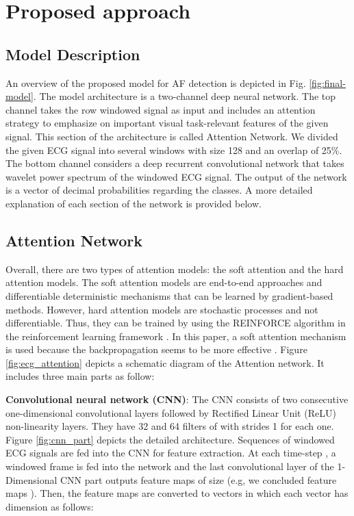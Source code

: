 \documentclass[conference]{IEEEtran}
\begin{document}
\section{Proposed approach}
\label{sec:propsed}
\subsection{Model Description}
An overview of the proposed model for AF detection is depicted in Fig. \ref{fig:final-model}. The model architecture is a two-channel deep neural network. The top channel takes the row windowed signal as input and includes an attention strategy to emphasize on important visual task-relevant features of the given signal. This section of the architecture is called Attention Network. We divided the given ECG signal into several windows with size 128 and an overlap of 25\%. The bottom channel considers a deep recurrent convolutional network that takes wavelet power spectrum of the windowed ECG signal. The output of the network is a vector of decimal probabilities regarding the classes. A more detailed explanation of each section of the network is provided below.

\subsection*{Attention Network}
Overall, there are two types of attention models: the soft attention and the hard attention models. The soft attention models are end-to-end approaches and differentiable deterministic mechanisms
that can be learned by gradient-based methods. However, hard attention models are stochastic processes and not differentiable. Thus, they can be trained by using the REINFORCE algorithm \cite{williams1992simple} in the reinforcement learning framework \cite{mousavi2016deep}.
In this paper, a soft attention mechanism is used because the backpropagation seems to be more effective  \cite{xu2015show,mousavi2016learning}. Figure \ref{fig:ecg_attention} depicts a schematic diagram  of the Attention network. It includes three main parts as follow:

\noindent\textbf{ Convolutional neural network (CNN)}: The CNN consists of two consecutive one-dimensional convolutional layers followed by Rectified Linear Unit (ReLU) non-linearity layers. They have 32 and 64 filters of  with strides 1 for each one. Figure \ref{fig:cnn_part} depicts the detailed architecture.  Sequences of windowed ECG signals are fed into the CNN for feature extraction. At each time-step , a windowed frame is fed into the network and the last convolutional layer of the 1-Dimensional CNN part outputs  feature maps of size  (e.g, we concluded  feature maps ).
Then, the feature maps are converted to  vectors in which each vector has  dimension as follows: 
\end{document}
